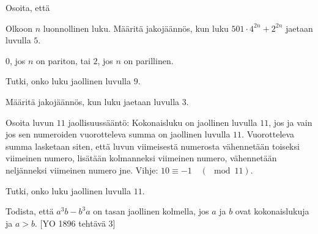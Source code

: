 \begin{kotitehtavasivu}
\begin{tehtava}
	Osoita, että
\end{tehtava}

\begin{tehtava}
	Olkoon $n$ luonnollinen luku. Määritä jakojäännös, kun luku $501 \cdot 4^{2n} + 2^{2n}$ jaetaan luvulla $5$.
  \begin{vastaus}
    $0$, jos $n$ on pariton, tai $2$, jos $n$ on parillinen.
  \end{vastaus}
\end{tehtava}

\begin{tehtava}
	Tutki, onko luku jaollinen luvulla $9$.
\end{tehtava}

\begin{tehtava}
	Määritä jakojäännös, kun luku jaetaan luvulla $3$.
\end{tehtava}

\begin{tehtava}
	Osoita luvun $11$ jaollisuussääntö: Kokonaisluku on jaollinen luvulla $11$, jos ja vain jos sen numeroiden vuorotteleva summa on jaollinen luvulla $11$. Vuorotteleva summa lasketaan siten, että luvun viimeisestä numerosta vähennetään toiseksi viimeinen numero, lisätään kolmanneksi viimeinen numero, vähennetään neljänneksi viimeinen numero jne. Vihje: $10\equiv -1\quad(\mod 11)$.
\end{tehtava}

\begin{tehtava}
	Tutki, onko luku jaollinen luvulla $11$.
\end{tehtava}

\begin{tehtava}
	Todista, että $a^3b-b^3a$ on tasan jaollinen kolmella, jos $a$ ja $b$ ovat kokonaislukuja ja $a>b$. 
	[YO 1896 tehtävä 3]
\end{tehtava}

\end{kotitehtavasivu}
